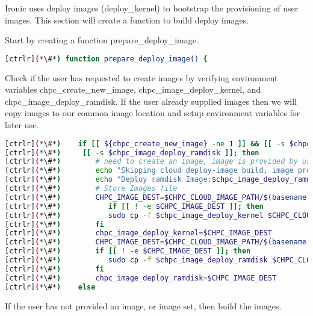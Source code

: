 	Ironic uses deploy images (deploy\_kernel) to bootstrap the provisioning of user images.  This section will create a function to build deploy images. 

	Start by creating a function prepare\_deploy\_image.

\begin{lstlisting}[language=bash,keywords={}]
[ctrlr](*\#*) function prepare_deploy_image() {
\end{lstlisting}

	Check if the user has requested to create images by verifying environment variables chpc\_create\_new\_image, chpc\_image\_deploy\_kernel, and chpc\_image\_deploy\_ramdisk. If the user already supplied images then we will copy images to our common image location and setup environment variables for later use.

\begin{lstlisting}[language=bash,keywords={}]
[ctrlr](*\#*)    if [[ ${chpc_create_new_image} -ne 1 ]] && [[ -s $chpc_image_deploy_kernel ]] && \
[ctrlr](*\#*)     [[ -s $chpc_image_deploy_ramdisk ]]; then
[ctrlr](*\#*)        # need to create an image, image is provided by user
[ctrlr](*\#*)        echo "Skipping cloud deploy-image build, image provided:"
[ctrlr](*\#*)        echo "Deploy ramdisk Image:$chpc_image_deploy_ramdisk"
[ctrlr](*\#*)        # Store Images file
[ctrlr](*\#*)        CHPC_IMAGE_DEST=$CHPC_CLOUD_IMAGE_PATH/$(basename $chpc_image_deploy_kernel)
[ctrlr](*\#*)           if [[ ! -e $CHPC_IMAGE_DEST ]]; then
[ctrlr](*\#*)           sudo cp -f $chpc_image_deploy_kernel $CHPC_CLOUD_IMAGE_PATH/
[ctrlr](*\#*)        fi
[ctrlr](*\#*)        chpc_image_deploy_kernel=$CHPC_IMAGE_DEST
[ctrlr](*\#*)        CHPC_IMAGE_DEST=$CHPC_CLOUD_IMAGE_PATH/$(basename $chpc_image_deploy_ramdisk)
[ctrlr](*\#*)        if [[ ! -e $CHPC_IMAGE_DEST ]]; then
[ctrlr](*\#*)           sudo cp -f $chpc_image_deploy_ramdisk $CHPC_CLOUD_IMAGE_PATH/
[ctrlr](*\#*)        fi
[ctrlr](*\#*)        chpc_image_deploy_ramdisk=$CHPC_IMAGE_DEST
[ctrlr](*\#*)    else
\end{lstlisting}

	If the user has not provided an image, or image set, then build the images.

